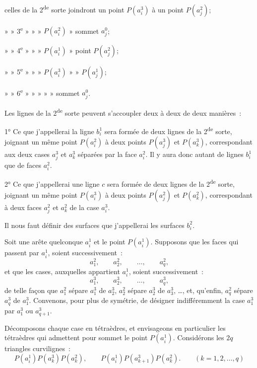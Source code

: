 \documentclass{article}
\begin{document}
celles de la 2\textsuperscript{de} sorte joindront un point $P(a^{3}_{i})$ à un point $P(a^{2}_{j})$;

» » 3\textsuperscript{e} » » » $P(a^{2}_{i})$ » sommet $a^{0}_{j}$;

» » 4\textsuperscript{e} » » » $P(a^{1}_{i})$ » point $P(a^{2}_{j})$;

» » 5\textsuperscript{e} » » » $P(a^{3}_{i})$ » » $P(a^{1}_{j})$;

» » 6\textsuperscript{e} » » » » » sommet $a^{0}_{j}$.

Les lignes de la 2\textsuperscript{de} sorte peuvent s'accoupler deux à deux de deux manières~:

1° Ce que j'appellerai la ligne $b^{1}_{i}$ sera formée de deux lignes de la 2\textsuperscript{de} sorte, joignant un même point $P(a^{2}_{i})$ à deux points $P(a^{3}_{j})$ et $P(a^{3}_{k})$, correspondant aux deux cases $a^{3}_{j}$ et $a^{3}_{k}$ séparées par la face $a^{2}_{i}$. Il y aura donc autant de lignes $b^{1}_{i}$ que de faces $a^{2}_{i}$.

2° Ce que j'appellerai une ligne $c$ sera formée de deux lignes de la 2\textsuperscript{de} sorte, joignant un même point $P(a^{3}_{i})$ à deux points $P(a^{2}_{j})$ et $P(a^{2}_{k})$, correspondant à deux faces $a^{2}_{j}$ et $a^{2}_{k}$ de la case $a^{3}_{i}$.

Il nous faut définir des surfaces que j'appellerai les surfaces $b^{2}_{i}$.

Soit une arête quelconque $a^{1}_{i}$ et le point $P(a^{1}_{i})$. Supposons que les faces qui passent par $a^{1}_{i}$, soient successivement~:
\[ a^{2}_{1}, \qquad a^{2}_{2}, \qquad \ldots, \qquad a^{2}_{q}, \]
et que les cases, auxquelles appartient $a^{1}_{i}$, soient successivement~:
\[ a^{3}_{1}, \qquad a^{3}_{2}, \qquad \ldots, \qquad a^{3}_{q}, \]
de telle façon que $a^{2}_{1}$ sépare $a^{3}_{1}$ de $a^{3}_{2}$, $a^{2}_{2}$ sépare $a^{3}_{2}$ de $a^{3}_{3}$, \ldots, et, qu'enfin, $a^{2}_{q}$ sépare $a^{3}_{q}$ de $a^{3}_{1}$. Convenons, pour plus de symétrie, de désigner indifféremment la case $a^{3}_{1}$ par $a^{3}_{1}$ ou $a^{3}_{q+1}$.

Décomposons chaque case en tétraèdres, et envisageons en particulier les tétraèdres qui admettent pour sommet le point $P(a^{1}_{i})$. Considérons les $2q$ triangles curvilignes~:
\[ P(a^{1}_{i}) P(a^{3}_{k}) P(a^{2}_{k}), \qquad P(a^{1}_{i}) P(a^{3}_{k+1}) P(a^{2}_{k}). \qquad (k = 1, 2, \ldots, q) \]

\end{document}
